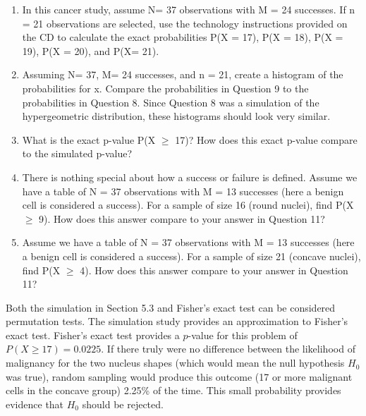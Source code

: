 \documentclass[
]{book}
\begin{document}
\begin{enumerate}
\def\labelenumi{\arabic{enumi}.}
\setcounter{enumi}{8}
\item
  In this cancer study, assume N= 37 observations with M = 24 successes. If n = 21 observations are selected, use the technology instructions provided on the CD to calculate the exact probabilities
  P(X = 17), P(X = 18), P(X = 19), P(X = 20), and P(X= 21).
\item
  Assuming N= 37, M= 24 successes, and n = 21, create a histogram of the probabilities for x. Compare the probabilities in Question 9 to the probabilities in Question 8. Since Question 8 was a simulation of the hypergeometric distribution, these histograms should look very similar.
\item
  What is the exact p-value P(X \(\geq\) 17)? How does this exact p-value compare to the simulated p-value?
\item
  There is nothing special about how a success or failure is defined. Assume we have a table of N = 37 observations with M = 13 successes (here a benign cell is considered a success). For a sample of size 16 (round nuclei), find P(X \(\geq\) 9). How does this answer compare to your answer in
  Question 11?
\item
  Assume we have a table of N = 37 observations with M = 13 successes (here a benign cell is considered a success). For a sample of size 21 (concave nuclei), find P(X \(\geq\) 4). How does this answer compare to your answer in Question 11?
\end{enumerate}

Both the simulation in Section 5.3 and Fisher's exact test can be considered permutation tests. The simulation study provides an approximation to Fisher's exact test. Fisher's exact test provides a \(p\)-value for this problem of \(P(X \geq 17)= 0.0225\). If there truly were no difference between the likelihood of malignancy for the two nucleus shapes (which would mean the null hypothesis \(H_0\) was true), random sampling would produce this outcome (17 or more malignant cells in the concave group) 2.25\% of the time. This small probability provides evidence that \(H_0\) should be rejected.
\end{document}
